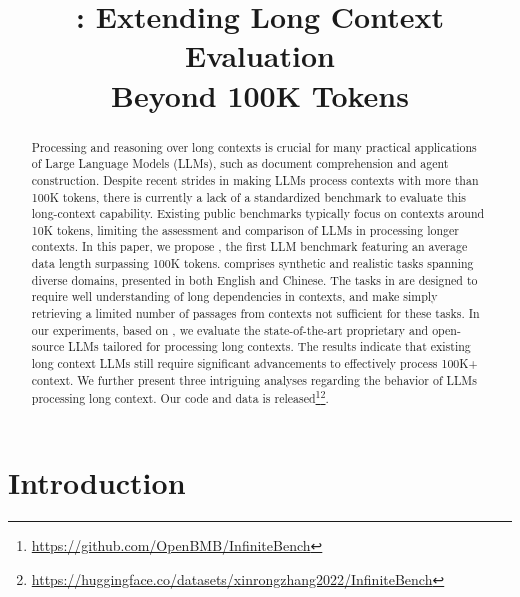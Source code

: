 \title{\OURS: Extending Long Context Evaluation \\ Beyond 100K Tokens}



\maketitle
\begin{abstract}

Processing and reasoning over long contexts is crucial for many practical applications of Large Language Models (LLMs), such as document comprehension and agent construction. Despite recent strides in making LLMs process contexts with more than 100K tokens, there is currently a lack of a standardized benchmark to evaluate this long-context capability. Existing public benchmarks typically focus on contexts around 10K tokens, limiting the assessment and comparison of LLMs in processing longer contexts. In this paper, we propose \OURS, the first LLM benchmark featuring an average data length surpassing 100K tokens. \OURSSPACE comprises synthetic and realistic tasks spanning diverse domains, presented in both English and Chinese. The tasks in \OURSSPACE are designed to require well understanding of long dependencies in contexts, and make simply retrieving a limited number of passages from contexts not sufficient for these tasks. In our experiments, based on \OURS, we evaluate the state-of-the-art proprietary and open-source LLMs tailored for processing long contexts. The results indicate that existing long context LLMs still require significant advancements to effectively process 100K+ context. We further present three intriguing analyses regarding the behavior of LLMs processing long context. Our code and data is released\footnote{\url{https://github.com/OpenBMB/InfiniteBench}}\footnote{\url{https://huggingface.co/datasets/xinrongzhang2022/InfiniteBench}}.

\end{abstract}

\section{Introduction}

